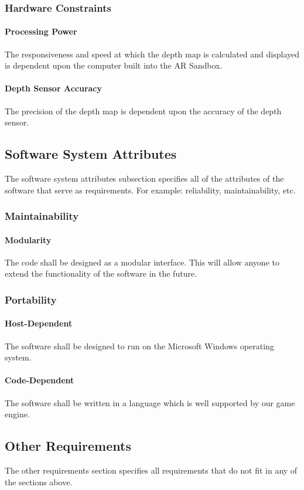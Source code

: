 \documentclass[onecolumn, draftclsnofoot,10pt, compsoc]{IEEEtran}
\begin{document}
\subsubsection{Hardware Constraints}
\paragraph{Processing Power}
The responsiveness and speed at which the depth map is calculated and displayed is dependent upon the computer built into the AR Sandbox. 
\paragraph{Depth Sensor Accuracy}
The precision of the depth map is dependent upon the accuracy of the depth sensor.

\subsection{Software System Attributes}
The software system attributes subsection specifies all of the attributes of the software that serve as requirements. For example: reliability, maintainability, etc.
\subsubsection{Maintainability}
\paragraph{Modularity}
The code shall be designed as a modular interface. This will allow anyone to extend the functionality of the software in the future.

\subsubsection{Portability}
\paragraph{Host-Dependent}
The software shall be designed to run on the Microsoft Windows operating system.
\paragraph{Code-Dependent} 
The software shall be written in a language which is well supported by our game engine.

\subsection{Other Requirements}
The other requirements section specifies all requirements that do not fit in any of the sections above.
\end{document}
